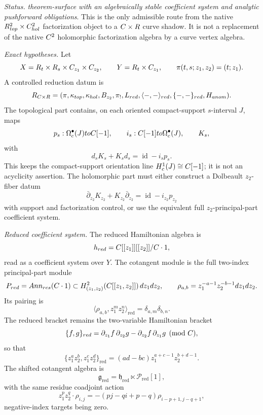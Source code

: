 \begin{stmt}\label{thm:lane-controlled-cxr-reduction}
  \emph{Status.} \emph{theorem-surface with an algebraically stable
  coefficient system and analytic pushforward obligations}.  This is the
  only admissible route from the native
  \(R^2_{top}\times C^2_{hol}\) factorization object
  to a \(C\times R\) curve shadow.  It is not a replacement of the
  native \(C^2\) holomorphic factorization algebra by a curve vertex
  algebra.

  \emph{Exact hypotheses.} Let
  \[
    X=R_t\times R_s\times C_{z_1}\times C_{z_2},
    \qquad
    Y=R_t\times C_{z_1},
    \qquad
    \pi(t,s;z_1,z_2)=(t;z_1).
  \]
  A controlled reduction datum is
  \[
    R_{C\times R}
    =
    (\pi,\kappa_{top},\kappa_{hol},
    B_{z_2},\pi_!,L_{red},
    \langle-,-\rangle_{red},
    \{-,-\}_{red},H_{anom}).
  \]
  The topological part contains, on each oriented compact-support
  \(s\)-interval \(J\), maps
  \[
    p_s:\Omega_c^\bullet(J)toC[-1],\qquad
    i_s:C[-1]to\Omega_c^\bullet(J),\qquad K_s,
  \]
  with
  \[
    d_sK_s+K_sd_s=\operatorname{id}-i_sp_s .
  \]
  This keeps the compact-support orientation line
  \(H_c^1(J)\cong C[-1]\); it is not an acyclicity assertion.  The
  holomorphic part must either construct a Dolbeault
  \(z_2\)-fiber datum
  \[
    \bar\partial_{z_2}K_{z_2}+K_{z_2}\bar\partial_{z_2}
    =
    \operatorname{id}-i_{z_2}p_{z_2}
  \]
  with support and factorization control, or use the equivalent full
  \(z_2\)-principal-part coefficient system.

  \emph{Reduced coefficient system.} The reduced Hamiltonian algebra is
  \[
    h_{red}
    =
    C[[z_1]][[z_2]]/C\cdot1,
  \]
  read as a coefficient system over \(Y\).  The cotangent module is the
  full two-index principal-part module
  \[
    P_{red}
    =
    Ann_{res}(C\cdot1)
    \subset
    H^2_{(z_1,z_2)}(C[[z_1,z_2]])\,dz_1dz_2,
    \qquad
    \rho_{a,b}=z_1^{-a-1}z_2^{-b-1}dz_1dz_2 .
  \]
  Its pairing is
  \[
    \langle\rho_{a,b},z_1^mz_2^n\rangle_{\mathrm{red}}
    =
    \delta_{a,m}\delta_{b,n}.
  \]
  The reduced bracket remains the two-variable Hamiltonian bracket
  \[
    \{f,g\}_{red}
    =
    \partial_{z_1}f\,\partial_{z_2}g
    -
    \partial_{z_2}f\,\partial_{z_1}g
    \pmod{C},
  \]
  so that
  \[
    \{z_1^az_2^b,z_1^cz_2^d\}_{\mathrm{red}}
    =
    (ad-bc)z_1^{a+c-1}z_2^{b+d-1}.
  \]
  The shifted cotangent algebra is
  \[
    \mathfrak g_{\mathrm{red}}
    =
    \mathfrak h_{\mathrm{red}}\ltimes
    \mathcal P_{\mathrm{red}}[1],
  \]
  with the same residue coadjoint action
  \[
    z_1^pz_2^q\cdot\rho_{i,j}
    =
    -(pj-qi+p-q)\rho_{i-p+1,j-q+1},
  \]
  negative-index targets being zero.


\end{stmt}
